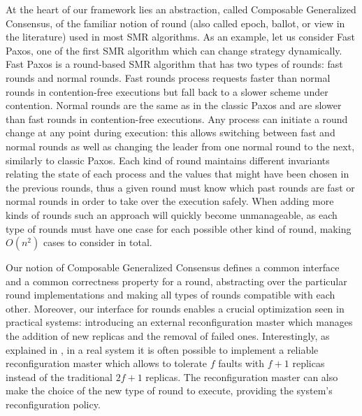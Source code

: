 At the heart of our framework lies an abstraction, called Composable Generalized
Consensus, of the familiar notion of round (also called epoch, ballot, or
view in the literature) used in most SMR algorithms. As an example, let us
consider Fast Paxos, one of the first SMR algorithm which can change strategy
dynamically. Fast Paxos is a round-based SMR algorithm that has two types of
rounds: fast rounds and normal rounds. Fast rounds process requests faster
than normal rounds in contention-free executions but fall back to a slower
scheme under contention. Normal rounds are the same as in the classic Paxos
and are slower than fast rounds in contention-free executions. Any process can
initiate a round change at any point during execution: this allows switching
between fast and normal rounds as well as changing the leader from one normal
round to the next, similarly to classic Paxos. Each kind of round maintains
different invariants relating the state of each process and the values that
might have been chosen in the previous rounds, thus a given round must know
which past rounds are fast or normal rounds in order to take over the execution
safely. When adding more kinds of rounds such an approach will quickly become
unmanageable, as each type of rounds must have one case for each possible other
kind of round, making $O(n^2)$ cases to consider in total.

Our notion of Composable Generalized Consensus defines a common interface and a
common correctness property for a round, abstracting over the particular round
implementations and making all types of rounds compatible with each other.
Moreover, our interface for rounds enables a crucial optimization seen in
practical systems: introducing an external reconfiguration master which manages
the addition of new replicas and the removal of failed ones. Interestingly, as
explained in \cite{LamportMalkhiZhou09VerticalPaxosPrimarybackupReplication},
in a real system it is often possible to implement a reliable reconfiguration
master which allows to tolerate $f$ faults with $f+1$ replicas instead of the
traditional $2f+1$ replicas. The reconfiguration master can also make the choice
of the new type of round to execute, providing the system's reconfiguration
policy.
